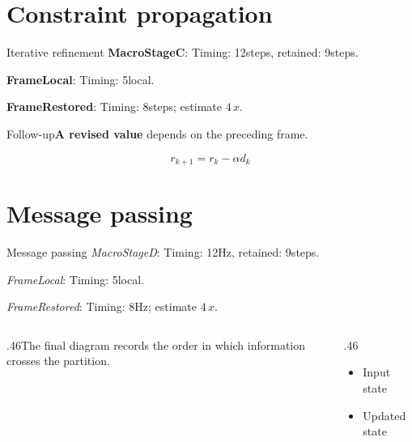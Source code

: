 \documentclass[9pt,aspectratio=43]{beamer}
\newcommand{\fuzzlayerA}[1]{\textbf{#1}}
\newcommand{\fuzzterm}[1]{\fuzzlayerA{#1}}
\newcommand{\fuzzpair}[2]{\fuzzterm{#1}: #2}
\newcommand{\fuzzunit}{steps}
\let\fuzzoriginalunit\fuzzunit
\newcommand{\fuzzcoefficient}{4}
\newcommand{\fuzzscale}[2][\fuzzcoefficient]{#1\,#2}
\begin{document}
\section{Constraint propagation}
\begin{frame}[t]{Iterative refinement}
\fuzzpair{MacroStageC}{Timing: 12\fuzzunit, retained: 9\fuzzoriginalunit.}\par
{\renewcommand{\fuzzunit}{local}\fuzzpair{FrameLocal}{Timing: 5\fuzzunit.}\par}
\fuzzpair{FrameRestored}{Timing: 8\fuzzunit; estimate $\fuzzscale{x}$.}\par
\begin{block}{Follow-up}\fuzzterm{A revised value} depends on the preceding frame.\end{block}
\[r_{k+1}=r_k-\alpha d_k\]
\end{frame}
\renewcommand{\fuzzunit}{Hz}
\renewcommand{\fuzzcoefficient}{4}
\renewcommand{\fuzzterm}[1]{{\textit{#1}}}
\section{Message passing}
\begin{frame}[t]{Message passing}
\fuzzpair{MacroStageD}{Timing: 12\fuzzunit, retained: 9\fuzzoriginalunit.}\par
{\renewcommand{\fuzzunit}{local}\fuzzpair{FrameLocal}{Timing: 5\fuzzunit.}\par}
\fuzzpair{FrameRestored}{Timing: 8\fuzzunit; estimate $\fuzzscale{x}$.}\par
\begin{columns}[T]\begin{column}{.46\textwidth}The final diagram records the order in which information crosses the partition.\end{column}\begin{column}{.46\textwidth}\begin{itemize}\item Input state\item Updated state\end{itemize}\end{column}\end{columns}
\end{frame}
\end{document}
